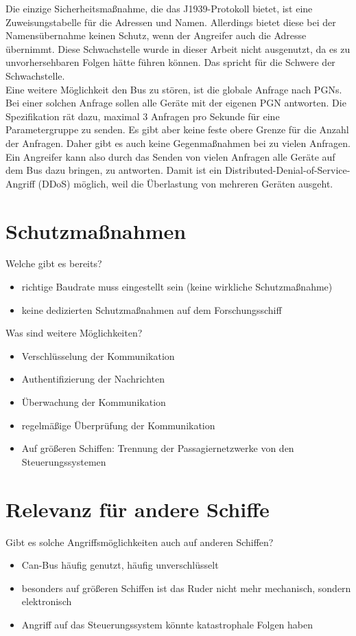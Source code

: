 Die einzige Sicherheitsmaßnahme, die das J1939-Protokoll bietet, ist eine Zuweisungstabelle für die Adressen und Namen. Allerdings
bietet diese bei der Namensübernahme keinen Schutz, wenn der Angreifer auch die Adresse übernimmt. Diese Schwachstelle 
wurde in dieser Arbeit nicht ausgenutzt, da es zu unvorhersehbaren Folgen hätte führen können. Das spricht für die 
Schwere der Schwachstelle.\\
Eine weitere Möglichkeit den Bus zu stören, ist die globale Anfrage nach PGNs. Bei einer solchen Anfrage sollen alle Geräte
mit der eigenen PGN antworten. Die Spezifikation rät dazu, maximal 3 Anfragen pro Sekunde für eine Parametergruppe zu senden.
Es gibt aber keine feste obere Grenze für die Anzahl der Anfragen. Daher gibt es auch keine Gegenmaßnahmen bei zu vielen 
Anfragen. Ein Angreifer kann also durch das Senden von vielen Anfragen alle Geräte auf dem Bus dazu bringen, zu antworten.
Damit ist ein Distributed-Denial-of-Service-Angriff (DDoS) möglich, weil die Überlastung von mehreren Geräten ausgeht. \\
\cite{Murvay2018}


\section{Schutzmaßnahmen}
Welche gibt es bereits?
\begin{itemize}
    \item richtige Baudrate muss eingestellt sein (keine wirkliche Schutzmaßnahme)
    \item keine dedizierten Schutzmaßnahmen auf dem Forschungsschiff
\end{itemize}
Was sind weitere Möglichkeiten?
\begin{itemize}
    \item Verschlüsselung der Kommunikation
    \item Authentifizierung der Nachrichten
    \item Überwachung der Kommunikation
    \item regelmäßige Überprüfung der Kommunikation
    \item Auf größeren Schiffen: Trennung der Passagiernetzwerke von den Steuerungssystemen
\end{itemize}

\section{Relevanz für andere Schiffe}
Gibt es solche Angriffsmöglichkeiten auch auf anderen Schiffen?
\begin{itemize}
    \item Can-Bus häufig genutzt, häufig unverschlüsselt
    \item besonders auf größeren Schiffen ist das Ruder nicht mehr mechanisch, sondern elektronisch
    \item Angriff auf das Steuerungssystem könnte katastrophale Folgen haben
\end{itemize}